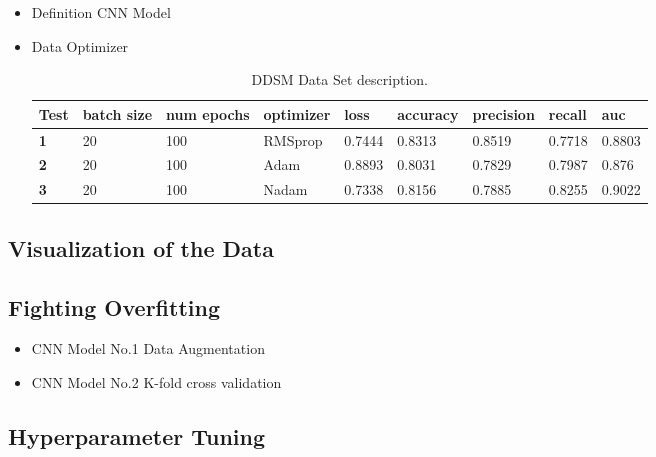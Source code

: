 \documentclass{book}
\begin{document}
            \begin{itemize}
                \item Definition CNN Model
                \item Data Optimizer
                
                \begin{table}
                    \begin{tabular}{m{1cm}m{1.5cm}m{1.8cm}m{1.5cm}m{1cm}m{1.2cm}m{1.2cm}m{1cm}m{1cm}}
                        \midrule
                        Test & batch size &	num epochs	& optimizer &	loss	& accuracy &	precision	& recall	& auc \\
                        \midrule
                        \textbf{1} & 20 &	100	& RMSprop & 0.7444	& 0.8313	& 0.8519	& 0.7718	& 0.8803 \\
                        \midrule
                        \textbf{2} & 20 &	100	& Adam & 0.8893	& 0.8031	& 0.7829	& 0.7987	& 0.876 \\
                        \midrule
                        \textbf{3} & 20 &	100	& Nadam & 0.7338	& 0.8156	& 0.7885	& 0.8255	& 0.9022 \\
                        \midrule
                    \end{tabular}
                    \caption{\label{tab:DDSM}DDSM Data Set description.}
                \end{table}

                

            \end{itemize}

            \subsection{Visualization of the Data}
            \subsection{Fighting Overfitting}

            \begin{itemize}
                \item CNN Model No.1 Data Augmentation
                \item CNN Model No.2 K-fold cross validation
            \end{itemize}

            \subsection{Hyperparameter Tuning}
\end{document}
